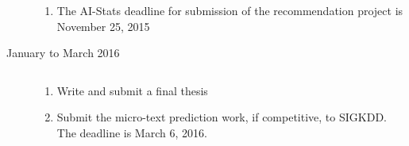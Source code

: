 \begin{description}
\begin{enumerate}
    \item The AI-Stats deadline for submission of the recommendation project is November 25, 2015
\end{enumerate}
\item[January to March 2016] $\text{ }$\\
    \begin{enumerate}
        \item Write and submit a final thesis
        \item Submit the micro-text prediction work, if competitive, to SIGKDD. The deadline is March 6, 2016. 
    \end{enumerate}
\end{description}


